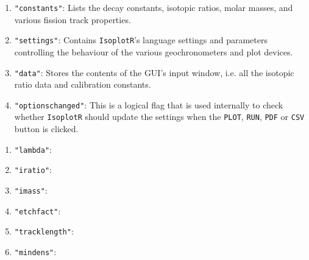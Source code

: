 \begin{refsection}
\begin{enumerate}
\item{\verb|"constants"|:} Lists the decay constants, isotopic ratios,
  molar masses, and various fission track properties.
\item{\verb|"settings"|:} Contains \texttt{IsoplotR}'s language
  settings and parameters controlling the behaviour of the various
  geochronometers and plot devices.
\item{\verb|"data"|:} Stores the contents of the GUI's input window,
  i.e. all the isotopic ratio data and calibration constants.
\item{\verb|"optionschanged"|:} This is a logical flag that is used
  internally to check whether \texttt{IsoplotR} should update the
  settings when the \texttt{PLOT}, \texttt{RUN}, \texttt{PDF} or
  \texttt{CSV} button is clicked.
\end{enumerate}

\begin{enumerate}[label*=1.\arabic*.]
\item{\verb|"lambda"|:}
\item{\verb|"iratio"|:}
\item{\verb|"imass"|:}
\item{\verb|"etchfact"|:}
\item{\verb|"tracklength"|:}
\item{\verb|"mindens"|:}
\end{enumerate}


\end{refsection}

